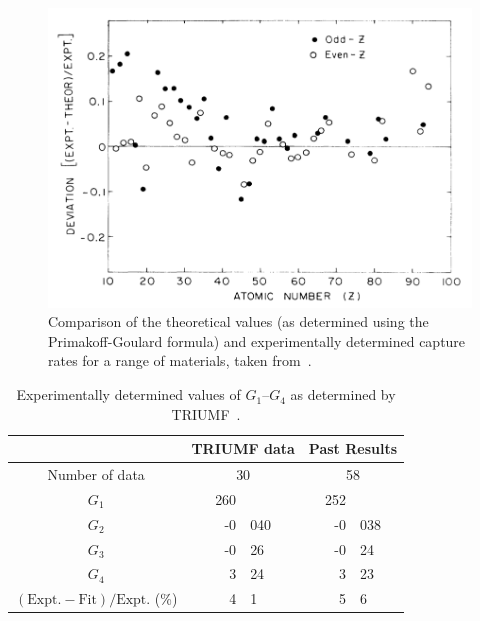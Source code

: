 \begin{figure}[hptb]
  \centering
    \includegraphics[width=.9\textwidth]{images/primakoff-goulard_vs_exp.png}
  \caption{Comparison of the theoretical values (as determined using the Primakoff-Goulard formula) and experimentally determined capture rates for a range of materials, taken from~\cite{Suzuki total nuclear capture rate}.}
  \label{fig:primakoff-goulard_vs_exp}
\end{figure}

\begin{table}
  \begin{center}
  \begin{tabular}{c | r@{.}l | r@{.}l }
                                                              & \multicolumn{2}{c|}{TRIUMF data} & \multicolumn{2}{c}{Past Results}  \\
    \hline
    Number of data                                            & \multicolumn{2}{c|}{30}          & \multicolumn{2}{c}{58}            \\
    \hline
    \( G_1 \)                                                 &             260 &                &              252 &                \\
    \( G_2 \)                                                 &              -0 & 040            &               -0 & 038            \\
    \( G_3 \)                                                 &              -0 & 26             &               -0 & 24             \\
    \( G_4 \)                                                 &               3 & 24             &                3 & 23             \\
    \hline
    \( (\textrm{Expt.} - \textrm{Fit})/\textrm{Expt.} \) (\%) &               4 & 1              &                5 & 6              \\
  \end{tabular}
  \end{center}
  \caption{Experimentally determined values of \( G_1 \)--\( G_4 \) as determined by TRIUMF~\cite{Suzuki total nuclear capture rate}.}
  \label{tab:g1_to_g4}
\end{table}


